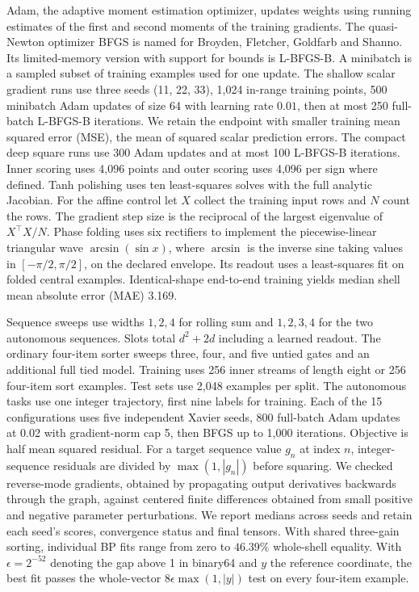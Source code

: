 Adam, the adaptive moment estimation optimizer, updates weights using running estimates of the first and second moments of the training gradients. The quasi-Newton optimizer BFGS is named for Broyden, Fletcher, Goldfarb and Shanno. Its limited-memory version with support for bounds is L-BFGS-B. A minibatch is a sampled subset of training examples used for one update. The shallow scalar gradient runs use three seeds (11, 22, 33), 1,024 in-range training points, 500 minibatch Adam updates of size 64 with learning rate \(0.01\), then at most 250 full-batch L-BFGS-B iterations. We retain the endpoint with smaller training mean squared error (MSE), the mean of squared scalar prediction errors. The compact deep square runs use 300 Adam updates and at most 100 L-BFGS-B iterations. Inner scoring uses 4,096 points and outer scoring uses 4,096 per sign where defined. Tanh polishing uses ten least-squares solves with the full analytic Jacobian. For the affine control let \(X\) collect the training input rows and \(N\) count the rows. The gradient step size is the reciprocal of the largest eigenvalue of \(X^\top X/N\). Phase folding uses six rectifiers to implement the piecewise-linear triangular wave \(\arcsin(\sin x)\), where \(\arcsin\) is the inverse sine taking values in \([-\pi/2,\pi/2]\), on the declared envelope. Its readout uses a least-squares fit on folded central examples. Identical-shape end-to-end training yields median shell mean absolute error (MAE) 3.169.

Sequence sweeps use widths \(1,2,4\) for rolling sum and \(1,2,3,4\) for the two autonomous sequences. Slots total \(d^2+2d\) including a learned readout. The ordinary four-item sorter sweeps three, four, and five untied gates and an additional full tied model. Training uses 256 inner streams of length eight or 256 four-item sort examples. Test sets use 2,048 examples per split. The autonomous tasks use one integer trajectory, first nine labels for training. Each of the 15 configurations uses five independent Xavier seeds, 800 full-batch Adam updates at 0.02 with gradient-norm cap 5, then BFGS up to 1,000 iterations. Objective is half mean squared residual. For a target sequence value \(g_n\) at index \(n\), integer-sequence residuals are divided by \(\max(1,|g_n|)\) before squaring. We checked reverse-mode gradients, obtained by propagating output derivatives backwards through the graph, against centered finite differences obtained from small positive and negative parameter perturbations. We report medians across seeds and retain each seed's scores, convergence status and final tensors. With shared three-gain sorting, individual BP fits range from zero to \(46.39\%\) whole-shell equality. With \(\epsilon=2^{-52}\) denoting the gap above 1 in binary64 and \(y\) the reference coordinate, the best fit passes the whole-vector \(8\epsilon\max(1,|y|)\) test on every four-item example.

